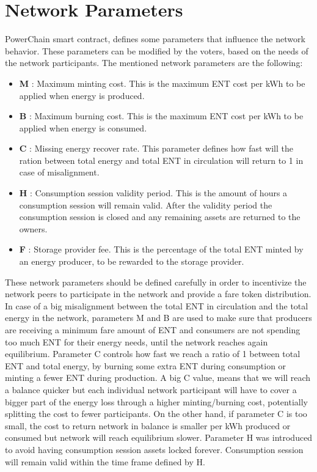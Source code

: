 \section{Network Parameters}
\label{networkParameters}
PowerChain smart contract, defines some parameters that influence the network behavior. These parameters can be modified by the voters, based on the needs of the network participants. 
The mentioned network parameters are the following:
\begin{itemize}
    \item \textbf{M} : Maximum minting cost. This is the maximum ENT cost per kWh to be applied when energy is produced.
    \item \textbf{B} : Maximum burning cost. This is the maximum ENT cost per kWh to be applied when energy is consumed.
    \item \textbf{C} : Missing energy recover rate. This parameter defines how fast will the ration between total energy and total ENT in circulation will return to 1 in case of misalignment.
    \item \textbf{H} : Consumption session validity period. This is the amount of hours a consumption session will remain valid. After the validity period the consumption session is closed and any remaining assets are returned to the owners.
    \item \textbf{F} : Storage provider fee. This is the percentage of the total ENT minted by an energy producer, to be rewarded to the storage provider.
\end{itemize}
These network parameters should be defined carefully in order to incentivize the network peers to participate in the network and provide a fare token distribution.
In case of a big misalignment between the total ENT in circulation and the total energy in the network, parameters M and B are used to make sure that producers are receiving a minimum fare amount of ENT and consumers are not spending too much ENT for their 
energy needs, until the network reaches again equilibrium. Parameter C controls how fast we reach a ratio of 1 between total ENT and total energy, by burning some extra ENT during consumption or minting a fewer ENT during production. A big C value, means that 
we will reach a balance quicker but each individual network participant will have to cover a bigger part of the energy loss through a higher minting/burning cost, potentially splitting the cost to fewer participants. On the other hand, if parameter C is too small, 
the cost to return network in balance is smaller per kWh produced or consumed but network will reach equilibrium slower. Parameter H was introduced to avoid having consumption session assets locked forever. Consumption session will remain valid within the time frame defined by H. 
